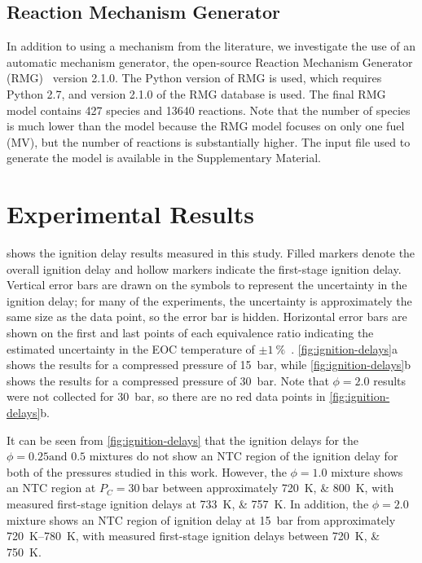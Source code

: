 \documentclass[letterpaper, review]{elsarticle}
\begin{document}
\subsection{Reaction Mechanism Generator}\label{sec:reaction-mechanism-generator}

In addition to using a mechanism from the literature, we investigate the use of an automatic
mechanism generator, the open-source Reaction Mechanism Generator (RMG)~\cite{Allen2012} version
2.1.0. The Python version of RMG is used, which requires Python 2.7, and version 2.1.0 of the RMG
database is used. The final RMG model contains 427 species and 13640 reactions. Note that the number
of species is much lower than the \citet{Dievart2013} model because the RMG model focuses on only
one fuel (MV), but the number of reactions is substantially higher. The input file used to generate
the model is available in the Supplementary Material.

\section{Experimental Results}\label{sec:experimental-results}

 shows the ignition delay results measured in this study. Filled markers
denote the overall ignition delay and hollow markers indicate the first-stage ignition delay.
Vertical error bars are drawn on the symbols to represent the uncertainty in the ignition delay; for
many of the experiments, the uncertainty is approximately the same size as the data point, so the
error bar is hidden. Horizontal error bars are shown on the first and last points of each
equivalence ratio indicating the estimated uncertainty in the EOC temperature of
$\pm\SI{1}{\percent}$~\cite{Weber2015}. \cref{fig:ignition-delays}a shows the results for a
compressed pressure of \SI{15}{\bar}, while \cref{fig:ignition-delays}b shows the results for a
compressed pressure of \SI{30}{\bar}. Note that $\phi=2.0$ results were not collected for
\SI{30}{\bar}, so there are no red data points in \cref{fig:ignition-delays}b.

It can be seen from \cref{fig:ignition-delays} that the ignition delays for the \(\phi=0.25\text{
and } 0.5\) mixtures do not show an NTC region of the ignition delay for both of the pressures
studied in this work. However, the $\phi=1.0$ mixture shows an NTC region at
$P_C=\SI[number-unit-product={\ }]{30}{\bar}$ between approximately \SIlist{720;800}{\K}, with
measured first-stage ignition delays at \SIlist{733;757}{\K}. In addition, the $\phi=2.0$ mixture
shows an NTC region of ignition delay at \SI{15}{\bar} from approximately \SIrange{720}{780}{\K},
with measured first-stage ignition delays between \SIlist{720;750}{\K}.
\end{document}
